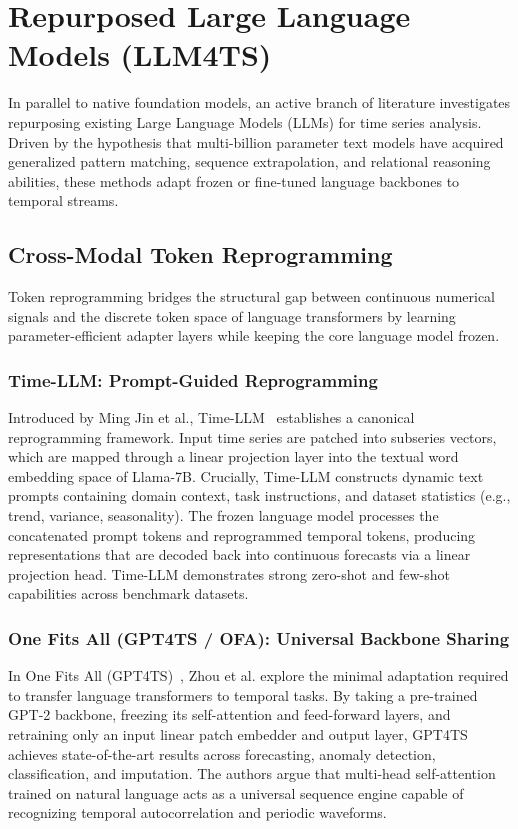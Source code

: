 \section{Repurposed Large Language Models (LLM4TS)}
\label{sec:llm4ts}

In parallel to native foundation models, an active branch of literature investigates repurposing existing Large Language Models (LLMs) for time series analysis. Driven by the hypothesis that multi-billion parameter text models have acquired generalized pattern matching, sequence extrapolation, and relational reasoning abilities, these methods adapt frozen or fine-tuned language backbones to temporal streams.

\subsection{Cross-Modal Token Reprogramming}

Token reprogramming bridges the structural gap between continuous numerical signals and the discrete token space of language transformers by learning parameter-efficient adapter layers while keeping the core language model frozen.

\subsubsection{Time-LLM: Prompt-Guided Reprogramming}
Introduced by Ming Jin et al., Time-LLM~\cite{jin2023timellm} establishes a canonical reprogramming framework. Input time series are patched into subseries vectors, which are mapped through a linear projection layer into the textual word embedding space of Llama-7B. Crucially, Time-LLM constructs dynamic text prompts containing domain context, task instructions, and dataset statistics (e.g., trend, variance, seasonality). The frozen language model processes the concatenated prompt tokens and reprogrammed temporal tokens, producing representations that are decoded back into continuous forecasts via a linear projection head. Time-LLM demonstrates strong zero-shot and few-shot capabilities across benchmark datasets.

\subsubsection{One Fits All (GPT4TS / OFA): Universal Backbone Sharing}
In One Fits All (GPT4TS)~\cite{zhou2023onefitsall}, Zhou et al. explore the minimal adaptation required to transfer language transformers to temporal tasks. By taking a pre-trained GPT-2 backbone, freezing its self-attention and feed-forward layers, and retraining only an input linear patch embedder and output layer, GPT4TS achieves state-of-the-art results across forecasting, anomaly detection, classification, and imputation. The authors argue that multi-head self-attention trained on natural language acts as a universal sequence engine capable of recognizing temporal autocorrelation and periodic waveforms.

